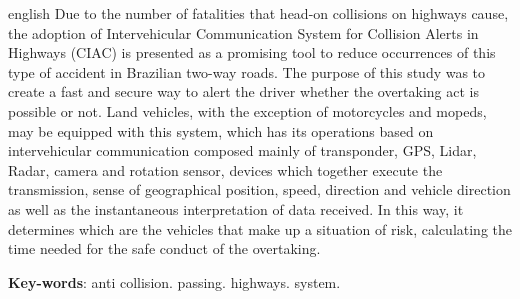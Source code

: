 \begin{resumo}[Abstract]
 \begin{otherlanguage*}{english}
   Due to the number of fatalities that head-on collisions on highways cause, the adoption of Intervehicular Communication System for Collision Alerts in Highways (CIAC) is presented as a promising tool to reduce occurrences of this type of accident in Brazilian two-way roads. The purpose of this study was to create a fast and secure way to alert the driver whether the overtaking act is possible or not. Land vehicles,  with the exception of motorcycles and mopeds, may be equipped with this system, which has its operations based on intervehicular communication composed mainly of transponder, GPS, Lidar, Radar, camera and rotation sensor, devices which together execute the transmission, sense of geographical position, speed, direction and vehicle direction as well as the instantaneous interpretation of data received. In this way, it determines which are the vehicles that make up a situation of risk, calculating the time needed for the safe conduct of the overtaking.


   \vspace{\onelineskip}

   \noindent
   \textbf{Key-words}: anti collision. passing. highways. system.
 \end{otherlanguage*}
\end{resumo}
